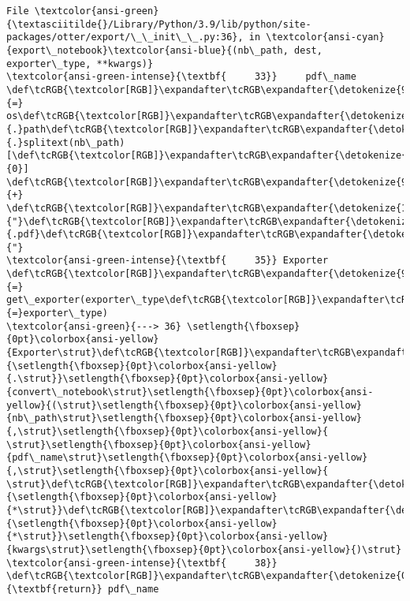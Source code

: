 \documentclass[11pt]{article}
\begin{document}
\begin{Verbatim}[commandchars=\\\{\}, frame=single, framerule=2mm, rulecolor=\color{outerrorbackground}]
File \textcolor{ansi-green}{\textasciitilde{}/Library/Python/3.9/lib/python/site-packages/otter/export/\_\_init\_\_.py:36}, in \textcolor{ansi-cyan}{export\_notebook}\textcolor{ansi-blue}{(nb\_path, dest, exporter\_type, **kwargs)}
\textcolor{ansi-green-intense}{\textbf{     33}}     pdf\_name \def\tcRGB{\textcolor[RGB]}\expandafter\tcRGB\expandafter{\detokenize{98,98,98}}{=} os\def\tcRGB{\textcolor[RGB]}\expandafter\tcRGB\expandafter{\detokenize{98,98,98}}{.}path\def\tcRGB{\textcolor[RGB]}\expandafter\tcRGB\expandafter{\detokenize{98,98,98}}{.}splitext(nb\_path)[\def\tcRGB{\textcolor[RGB]}\expandafter\tcRGB\expandafter{\detokenize{98,98,98}}{0}] \def\tcRGB{\textcolor[RGB]}\expandafter\tcRGB\expandafter{\detokenize{98,98,98}}{+} \def\tcRGB{\textcolor[RGB]}\expandafter\tcRGB\expandafter{\detokenize{175,0,0}}{"}\def\tcRGB{\textcolor[RGB]}\expandafter\tcRGB\expandafter{\detokenize{175,0,0}}{.pdf}\def\tcRGB{\textcolor[RGB]}\expandafter\tcRGB\expandafter{\detokenize{175,0,0}}{"}
\textcolor{ansi-green-intense}{\textbf{     35}} Exporter \def\tcRGB{\textcolor[RGB]}\expandafter\tcRGB\expandafter{\detokenize{98,98,98}}{=} get\_exporter(exporter\_type\def\tcRGB{\textcolor[RGB]}\expandafter\tcRGB\expandafter{\detokenize{98,98,98}}{=}exporter\_type)
\textcolor{ansi-green}{---> 36} \setlength{\fboxsep}{0pt}\colorbox{ansi-yellow}{Exporter\strut}\def\tcRGB{\textcolor[RGB]}\expandafter\tcRGB\expandafter{\detokenize{98,98,98}}{\setlength{\fboxsep}{0pt}\colorbox{ansi-yellow}{.\strut}}\setlength{\fboxsep}{0pt}\colorbox{ansi-yellow}{convert\_notebook\strut}\setlength{\fboxsep}{0pt}\colorbox{ansi-yellow}{(\strut}\setlength{\fboxsep}{0pt}\colorbox{ansi-yellow}{nb\_path\strut}\setlength{\fboxsep}{0pt}\colorbox{ansi-yellow}{,\strut}\setlength{\fboxsep}{0pt}\colorbox{ansi-yellow}{ \strut}\setlength{\fboxsep}{0pt}\colorbox{ansi-yellow}{pdf\_name\strut}\setlength{\fboxsep}{0pt}\colorbox{ansi-yellow}{,\strut}\setlength{\fboxsep}{0pt}\colorbox{ansi-yellow}{ \strut}\def\tcRGB{\textcolor[RGB]}\expandafter\tcRGB\expandafter{\detokenize{98,98,98}}{\setlength{\fboxsep}{0pt}\colorbox{ansi-yellow}{*\strut}}\def\tcRGB{\textcolor[RGB]}\expandafter\tcRGB\expandafter{\detokenize{98,98,98}}{\setlength{\fboxsep}{0pt}\colorbox{ansi-yellow}{*\strut}}\setlength{\fboxsep}{0pt}\colorbox{ansi-yellow}{kwargs\strut}\setlength{\fboxsep}{0pt}\colorbox{ansi-yellow}{)\strut}
\textcolor{ansi-green-intense}{\textbf{     38}} \def\tcRGB{\textcolor[RGB]}\expandafter\tcRGB\expandafter{\detokenize{0,135,0}}{\textbf{return}} pdf\_name


\end{Verbatim}
\end{document}
